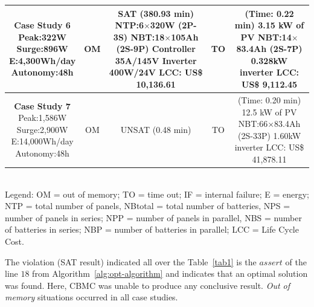 \documentclass[runningheads]{llncs}
\begin{document}
\begin{table}
\begin{scriptsize}
\begin{tabular}{c|c|c|c|c}
\hline
\makecell{\textbf{Case Study 6}\\Peak:322W\\Surge:896W\\E:4,300Wh/day\\Autonomy:48h} & OM & \makecell {SAT (380.93 min) \\NTP:6$\times$320W (2P-3S)\\NBT:18$\times$105Ah (2S-9P)\\Controller 35A/145V\\Inverter 400W/24V \\LCC: US\$ 10,136.61} & TO & \makecell{(Time: 0.22 min)\\3.15 kW of PV\\NBT:14$\times$83.4Ah (2S-7P)\\0.328kW inverter\\LCC: US\$ 9,112.45} \\
\hline
\makecell{\textbf{Case Study 7}\\Peak:1,586W\\Surge:2,900W\\E:14,000Wh/day\\Autonomy:48h} & OM & UNSAT (0.48 min) & TO & \makecell{(Time: 0.20 min)\\12.5 kW of PV\\NBT:66$\times$83.4Ah (2S-33P)\\1.60kW inverter\\LCC: US\$ 41,878.11} \\
\hline
\hline
\end{tabular}
\\Legend: OM = out of memory; TO = time out; IF = internal failure; E = energy;    NTP = total number of panels, NBtotal = total number of batteries, NPS = number of panels in series; NPP = number of panels in parallel, NBS = number of batteries in series; NBP = number of batteries in parallel; LCC = Life Cycle Cost.
\end{scriptsize}
\end{table}
%
The violation (SAT result) indicated all over the Table~\ref{tab1} 
is the $assert$ of the line $18$ from Algorithm~\ref{alg:opt-algorithm} and indicates that an optimal solution was found.
Here, CBMC was unable to produce any conclusive result. \textit{Out of memory} situations occurred in all case studies.
\end{document}
